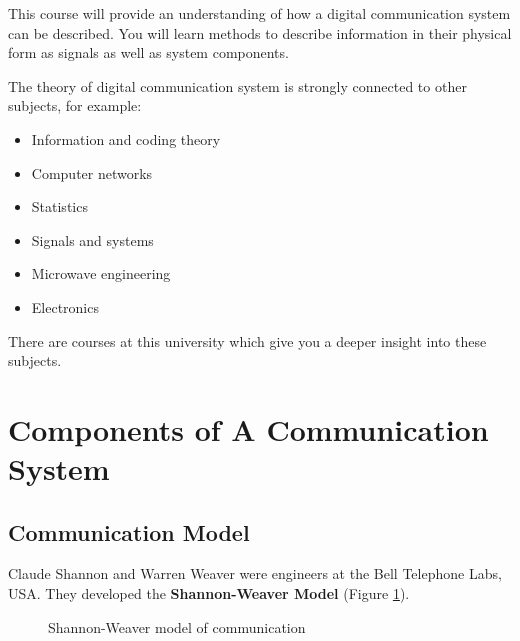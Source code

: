 \begin{refsection}
This course will provide an understanding of how a digital communication system can be described. You will learn methods to describe information in their physical form as signals as well as system components. 

The theory of digital communication system is strongly connected to other subjects, for example:
\begin{itemize}
	\item Information and coding theory
	\item Computer networks
	\item Statistics
	\item Signals and systems
	\item Microwave engineering
	\item Electronics
\end{itemize}
There are courses at this university which give you a deeper insight into these subjects.


\section{Components of A Communication System}


\subsection{Communication Model}

Claude Shannon and Warren Weaver were engineers at the Bell Telephone Labs, USA. They developed the  \textbf{Shannon-Weaver Model} \cite{Shannon1949} (Figure \ref{fig:ch01:shannon_weaver_model}).

\begin{figure}[H]
	\centering
	\caption{Shannon-Weaver model of communication}
	\label{fig:ch01:shannon_weaver_model}
\end{figure}


\end{refsection}
